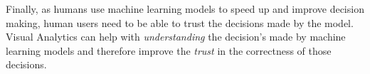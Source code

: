 Finally, as humans use machine learning models to speed up and improve decision making, human users need to be able to trust the decisions made by the model.
Visual Analytics can help with \emph{understanding} the decision's made by machine learning models and therefore improve the \emph{trust} in the correctness of those decisions.
